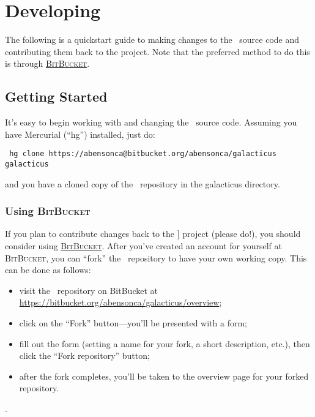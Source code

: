 \chapter{Developing \glc}

The following is a quickstart guide to making changes to the \glc\ source code and contributing them back to the project. Note that the preferred method to do this is through \href{https://bitbucket.org}{\normalfont \scshape BitBucket}.

\section{Getting Started}

It's easy to begin working with and changing the \glc\ source code. Assuming you have Mercurial (``{\normalfont \ttfamily hg}'') installed, just do:
\begin{verbatim}
 hg clone https://abensonca@bitbucket.org/abensonca/galacticus galacticus
\end{verbatim}
and you have a cloned copy of the \glc\ repository in the {\normalfont \ttfamily galacticus} directory.

\subsection{Using {\normalfont \scshape BitBucket}}

If you plan to contribute changes back to the \glc] project (please do!), you should consider using \href{https://bitbucket.org}{\normalfont \scshape BitBucket}. After you've created an account for yourself at {\normalfont \scshape BitBucket}, you can ``fork'' the \glc\ repository to have your own working copy. This can be done as follows:
\begin{itemize}
 \item visit the \glc\ repository on {\normalfont \ttfamily BitBucket} at \href{https://bitbucket.org/abensonca/galacticus/overview}{\normalfont \ttfamily https://bitbucket.org/abensonca/galacticus/overview};
 \item click on the ``Fork'' button---you'll be presented with a form;
 \item fill out the form (setting a name for your fork, a short description, etc.), then click the ``Fork repository'' button;
 \item after the fork completes, you'll be taken to the overview page for your forked repository.
\end{itemize}. 

